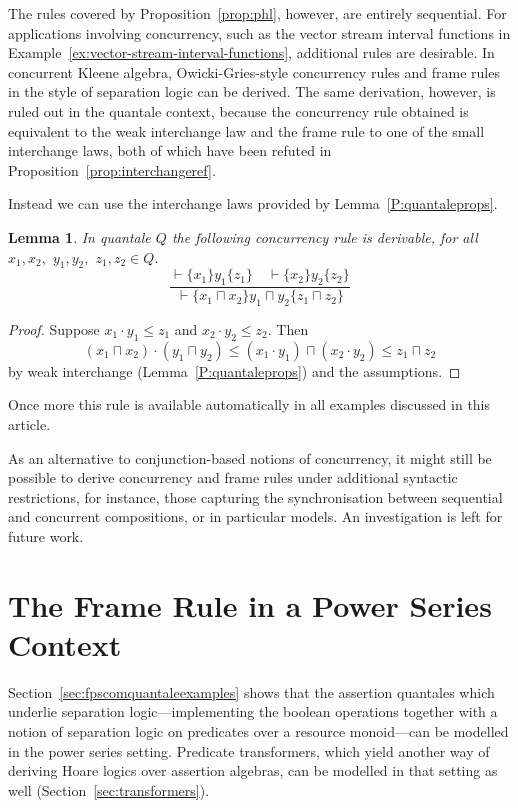 \documentclass[12pt]{article}
\newtheorem{lemma}{Lemma}
\theoremstyle{definition}
\begin{document}
The rules covered by Proposition~\ref{prop:phl}, however, are entirely
sequential. For applications involving concurrency, such as the vector
stream interval functions in
Example~\ref{ex:vector-stream-interval-functions}, additional rules are
desirable.  In concurrent Kleene algebra, Owicki-Gries-style
concurrency rules and frame rules in the style of separation logic can
be derived. The same derivation, however, is ruled out in the quantale
context, because the concurrency rule obtained is equivalent to the
weak interchange law and the frame rule to one of the small
interchange laws, both of which have been refuted in
Proposition~\ref{prop:interchangeref}.

Instead we can use the interchange laws provided by
Lemma~\ref{P:quantaleprops}.
\begin{lemma}\label{lem:quantale-concrule}
  In quantale $Q$ the following concurrency rule is derivable,
  for all $x_1,x_2,$ $y_1,y_2,$ $z_1,z_2\in Q$.
\begin{equation*}
  \frac{\vdash \{x_1\}y_1\{z_1\}\quad \vdash \{x_2\}y_2\{z_2\}}{\vdash \{x_1\sqcap x_2\}y_1\sqcap y_2\{z_1\sqcap z_2\}}
\end{equation*}
\end{lemma}
\begin{proof}
Suppose $x_1\cdot y_1\le z_1$ and $x_2\cdot y_2\le
z_2$. Then 
\begin{equation*}
    (x_1\sqcap x_2)\cdot (y_1\sqcap y_2) 
  \le (x_1\cdot y_1)\sqcap (x_2 \cdot y_2)
  \le z_1\sqcap z_2
\end{equation*}
by weak interchange (Lemma~\ref{P:quantaleprops}) and the assumptions.
\end{proof}
\noindent Once more this rule is available automatically in all examples
discussed in this article.


As an alternative to conjunction-based notions of concurrency, it
might still be possible to derive concurrency and frame rules under
additional syntactic restrictions, for instance, those capturing the
synchronisation between sequential and concurrent compositions, or in
particular models. An investigation is left for future work.



\section{The Frame Rule in a Power Series Context}\label{sec:frame}

Section~\ref{sec:fpscomquantaleexamples} shows that the assertion
quantales which underlie separation logic---implementing the boolean
operations together with a notion of separation logic on predicates
over a resource monoid---can be modelled in the power series setting.
Predicate transformers, which yield another way of deriving Hoare
logics over assertion algebras, can be modelled in that setting as
well (Section~\ref{sec:transformers}).
\end{document}
